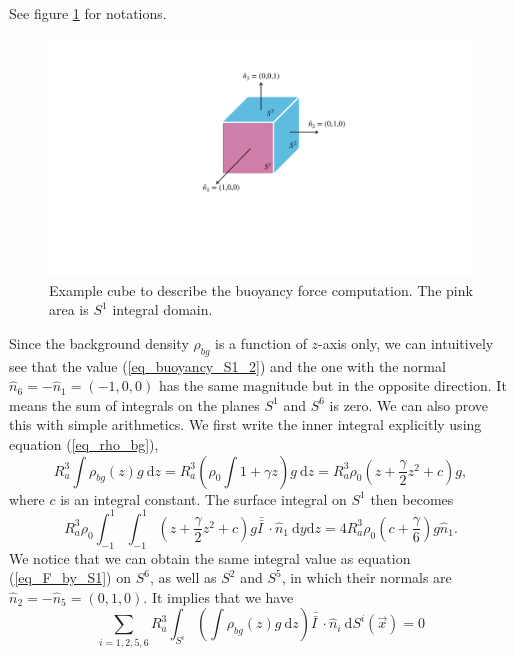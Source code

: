 See figure \ref{fig_rho_bg_on_S1} for notations.
\begin{figure}[h]
	\begin{center}
		\includegraphics[scale=0.3]{./figures/fig_rho_bg_on_S1.pdf}
	\caption{Example cube to describe the buoyancy force computation. The pink area is $S^1$ integral domain.}
	\label{fig_rho_bg_on_S1}
\end{center}
\end{figure}
Since the background density $\rho_{bg}$ is a function of $z$-axis only, we can intuitively see that the value (\ref{eq_buoyancy_S1_2}) and the one with the normal $\hat{n}_6 = -\hat{n}_1 = (-1,0,0)$ has the same magnitude but in the opposite direction. It means the sum of integrals on the planes $S^1$ and $S^6$ is zero. We can also prove this with simple arithmetics. 
We first write the inner integral explicitly using equation (\ref{eq_rho_bg}),
\[
R_a^3 \int  {\rho_{bg}} (z)g  \ \textrm{d}z 
 =  R_a^3 \left( \rho_0 \int  1+\gamma  z \right) g \ \textrm{d}z 
=R_a^3 \rho_0 \left(  z + \frac{\gamma}{2}z^2 + c \right) g,
\]
where $c$ is an integral constant. 
The surface integral on $S^1$ then becomes 
\begin{equation}
	R_a^3\rho_0  \int_{-1}^{1} \int_{-1}^{1}
	\left( 
	 z + \frac{\gamma}{2}z^2 + c 
   \right) g \bar{\bar{I \ }}  \cdot
   \hat{n}_1 \ 
  \textrm{d}y  \textrm{d}z 
=4 R_a^3 \rho_0 \left( c + \frac{\gamma}{6} \right) g \hat{n}_1 .
\label{eq_F_by_S1}
\end{equation}
We notice that we can obtain the same integral value as equation (\ref{eq_F_by_S1}) on $S^6$, as well as  $S^2$ and $S^5$, in which their normals are $\hat{n}_2 = -\hat{n}_5 = (0,1,0)$. It implies that we have 
\begin{equation}
	\sum_{i=1,2,5,6}
	 R_a^3 \int_{S^i} \left( 
	   \int  {\rho_{bg}} (z) g  \ \textrm{d}z 
	 \right) \bar{\bar{I \ }}  \cdot
	\hat{n}_i \ \textrm{d}S^i (\vec{x})
	 = 0
\label{eq_buoyancy_zero_oneCube}
\end{equation}
